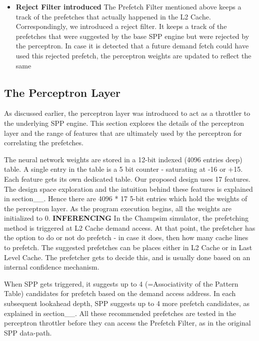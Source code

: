 \documentclass{sig-alternate}
\begin{document}
\begin{itemize}
\item \textbf{Reject Filter introduced}\newline
The Prefetch Filter mentioned above keeps a track of the prefetches that actually happened in the L2 Cache. 
Correspondingly, we introduced a reject filter. 
It keeps a track of the prefetches that were suggested by the base SPP engine but were rejected by the perceptron. 
In case it is detected that a future demand fetch could have used this rejected prefetch, the perceptron weights are updated to reflect the same

\end{itemize}

\subsection{The Perceptron Layer}
As discussed earlier, the perceptron layer was introduced to act as a throttler to the underlying SPP engine. 
This section explores the details of the perceptron layer and the range of features that are ultimately used by the perceptron for correlating the prefetches.

The neural network weights are stored in a 12-bit indexed (4096 entries deep) table. 
A single entry in the table is a 5 bit counter - saturating at -16 or +15. 
Each feature gets its own dedicated table. 
Our proposed design uses 17 features. 
The design space exploration and the intuition behind these features is explained in section\_\_. 
Hence there are 4096 * 17 5-bit entries which hold the weights of the perceptron layer. 
As the program execution begins, all the weights are initialized to 0.
\newline
\newline
\textbf{INFERENCING}\newline
In the Champsim simulator, the prefetching method is triggered at L2 Cache demand access. 
At that point, the prefetcher has the option to do or not do prefetch - in case it does, then how many cache lines to prefetch. 
The suggested prefetches can be places either in L2 Cache or in Last Level Cache. 
The prefetcher gets to decide this, and is usually done based on an internal confidence mechanism.

When SPP gets triggered, it suggests up to 4 (=Associativity of the Pattern Table) candidates for prefetch based on the demand access address. 
In each subsequent lookahead depth, SPP suggests up to 4 more prefetch candidates, as explained in section\_\_. 
All these recommended prefetches are tested in the perceptron throttler before they can access the Prefetch Filter, as in the original SPP data-path.
\end{document}
